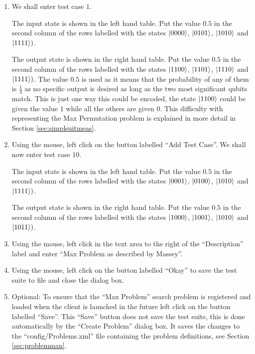 \begin{enumerate}
\item We shall enter test case $1$.

The input state is shown in the left hand table.
Put the value $0.5$ in the second column of the rows labelled with the states $\left\vert{0000}\right\rangle$, $\left\vert{0101}\right\rangle$, $\left\vert{1010}\right\rangle$ and $\left\vert{1111}\right\rangle)$.

The output state is shown in the right hand table.
Put the value $0.5$ in the second column of the rows labelled with the states $\left\vert{1100}\right\rangle$, $\left\vert{1101}\right\rangle$, $\left\vert{1110}\right\rangle$ and $\left\vert{1111}\right\rangle)$.
The value $0.5$ is used as it means that the probability of any of them is $\frac{1}{4}$ as no specific output is desired as long as the two most significant qubits match.
This is just one way this could be encoded, the state $\left\vert{1100}\right\rangle$ could be given the value $1$ while all the others are given $0$.
This difficulty with representing the Max Permutation problem is explained in more detail in Section \ref{sec:simplsuitmeas}.

\item \label{enum:addtcstep} Using the mouse, left click on the button labelled ``Add Test Case''.
We shall now enter test case $10$.

The input state is shown in the left hand table.
Put the value $0.5$ in the second column of the rows labelled with the states $\left\vert{0001}\right\rangle$, $\left\vert{0100}\right\rangle$, $\left\vert{1010}\right\rangle$ and $\left\vert{1111}\right\rangle)$.

The output state is shown in the right hand table.
Put the value $0.5$ in the second column of the rows labelled with the states $\left\vert{1000}\right\rangle$, $\left\vert{1001}\right\rangle$, $\left\vert{1010}\right\rangle$ and $\left\vert{1011}\right\rangle)$.

\item Using the mouse, left click in the text area to the right of the ``Description'' label and enter ``Max Problem as described by Massey''.

\item Using the mouse, left click on the button labelled ``Okay'' to save the test suite to file and close the dialog box.

\item \label{enum:createsaveprobs}Optional: To ensure that the ``Max Problem'' search problem is registered and loaded when the client is launched in the future left click on the button labelled ``Save''.
This ``Save'' button does not save the test suite, this is done automatically by the ``Create Problem'' dialog box.
It saves the changes to the ``config/Problems.xml'' file containing the problem definitions, see Section \ref{sec:problemman}.
\end{enumerate}

